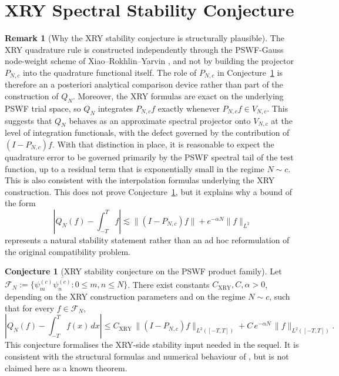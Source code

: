 \documentclass[12pt,a4paper]{amsart}
\theoremstyle{definition}
\newtheorem{remark}[theorem]{Remark}
\newtheorem{conjecture}[theorem]{Conjecture}
\newcommand{\norm}[1]{\|#1\|}
\newcommand{\PN}{P_{N,c}}
\newcommand{\CXRY}{C_{\mathrm{XRY}}}
\begin{document}
\section{XRY Spectral Stability Conjecture}\label{sec:xry_accuracy}

\begin{remark}[Why the XRY stability conjecture is structurally plausible]
The XRY quadrature rule is constructed independently through the
PSWF-Gauss node-weight scheme of Xiao--Rokhlin--Yarvin \cite{Xiao2001}, and
not by building the projector $\PN$ into the quadrature functional itself.
The role of $\PN$ in Conjecture~\ref{conj:xry_stability} is therefore
an a posteriori analytical comparison device rather than part of the
construction of $Q_N$. Moreover, the XRY formulas are exact on the
underlying PSWF trial space, so $Q_N$ integrates $\PN f$ exactly whenever
$\PN f\in V_{N,c}$. This suggests that $Q_N$ behaves as an approximate
spectral projector onto $V_{N,c}$ at the level of integration functionals,
with the defect governed by the contribution of $(I-\PN)f$. With that
distinction in place, it is reasonable to expect the quadrature error to be
governed primarily by the PSWF spectral tail of the test function, up to a
residual term that is exponentially small in the regime $N\sim c$. This is
also consistent with the interpolation formulas underlying the XRY
construction. This does not prove Conjecture~\ref{conj:xry_stability}, but
it explains why a bound of the form
\[
  |Q_N(f)-\textstyle\int_{-T}^T f|\lesssim \|(I-\PN)f\| + e^{-\alpha N}\norm{f}_{L^2}
\]
represents a natural stability statement rather than an ad hoc
reformulation of the original compatibility problem.
\end{remark}

\begin{conjecture}[XRY stability conjecture on the PSWF product family]
\label{conj:xry_stability}
Let
$\mathcal{F}_N:=\{\psi_m^{(c)}\overline{\psi_n^{(c)}}:0\le m,n\le N\}$.
There exist constants $\CXRY,C,\alpha>0$, depending on the XRY
construction parameters and on the regime $N\sim c$, such that for every
$f\in\mathcal{F}_N$,
\[
  \left|Q_N(f)-\int_{-T}^T f(x)\,dx\right|
  \le \CXRY\,\|(I-\PN)f\|_{L^2([-T,T])}
      + C\,e^{-\alpha N}\,\norm{f}_{L^2([-T,T])}.
\]
This conjecture formalises the XRY-side stability input needed in the
sequel. It is consistent with the structural formulas and numerical
behaviour of \cite{Xiao2001,OsipovRokhlinXiao}, but is not claimed here as a
known theorem.
\end{conjecture}
\end{document}
